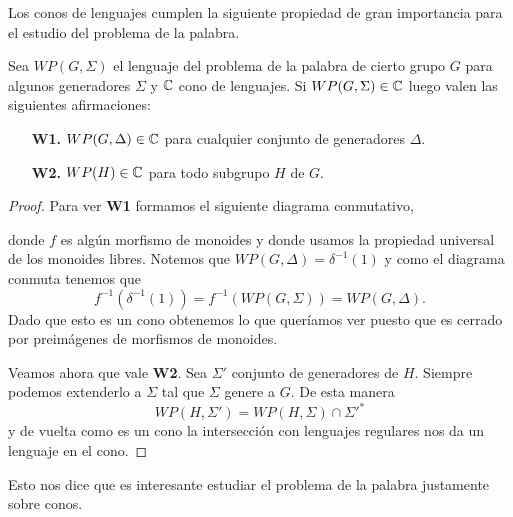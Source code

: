 \documentclass[tesis.tex]{subfiles}
\begin{document}
Los conos de lenguajes cumplen la siguiente propiedad de gran importancia para el estudio del problema de la palabra.
\medskip
\begin{prop}\label{prop-cono-wp}
	Sea $WP(G, \Sigma)$ el lenguaje del problema de la palabra de cierto grupo $G$ para algunos generadores $\Sigma$ y $\mathbb{C}$ cono de lenguajes. 
	Si $WP(G, \Sigma) \in \mathbb{C}$ luego valen las siguientes afirmaciones:
	\begin{itemize}
		\item[\textbf{W1.}] $WP(G, \Delta) \in \mathbb{C}$ para cualquier conjunto de generadores $\Delta$.
		\item[\textbf{W2.}] $WP(H) \in \mathbb{C}$ para todo subgrupo $H$ \fg de $G$.
	\end{itemize} 
\end{prop}
\begin{proof}
		Para ver \textbf{W1} formamos el siguiente diagrama conmutativo,
		\begin{center}
		\end{center}
		donde $f$ es algún morfismo de monoides y donde usamos la propiedad universal de los monoides libres.
		Notemos que $WP(G, \Delta) = \delta^{-1}(1)$ y como el diagrama conmuta tenemos que 
		\[
		f^{-1}(\delta^{-1}(1)) = f^{-1}(WP(G,\Sigma)) = WP(G, \Delta).
		\]
		Dado que esto es un cono obtenemos lo que queríamos ver puesto que es cerrado por preimágenes de morfismos de monoides.
		
		
		
		Veamos ahora que vale \textbf{W2}. 
		Sea $\Sigma'$ conjunto de generadores de $H$.
		Siempre podemos extenderlo a $\Sigma$ tal que $\Sigma$ genere a $G$. 
		De esta manera 
		\[
		WP(H, \Sigma') = WP(H, \Sigma) \cap \Sigma'^*
		\]
		y de vuelta como es un cono la intersección con lenguajes regulares nos da un lenguaje en el cono. 

\end{proof}


Esto nos dice que es interesante estudiar el problema de la palabra justamente sobre conos.
\end{document}
